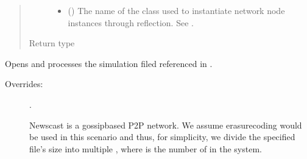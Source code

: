 \documentclass[letterpaper,10pt,english]{sphinxmanual}
\begin{document}
\begin{fulllineitems}
\begin{fulllineitems}
\begin{quote}
\begin{description}
\begin{itemize}
\item {} 
 () \textendash{} The name of the class used to instantiate network node
instances through reflection. See {\hyperref[\detokenize{app.domain:module-app.domain.network_nodes}]{}}.

\end{itemize}

\item[{Return type}] \leavevmode
{}

\end{description}\end{quote}

\end{fulllineitems}


\begin{fulllineitems}
\label{\detokenize{app.domain:app.domain.master_servers.NewscastMaster._process_simfile}}
Opens and processes the simulation filed referenced in .
\begin{description}
\item[{Overrides:}] \leavevmode
{\hyperref[\detokenize{app.domain:app.domain.master_servers.Master._process_simfile}]{}}.

Newscast is a gossip\sphinxhyphen{}based P2P network. We assume erasure\sphinxhyphen{}coding
would be used in this scenario and thus, for simplicity,
we divide the specified file’s size into multiple ,
where  is the number of {\hyperref[\detokenize{app.domain:app.domain.network_nodes.NewscastNode}]{}} in the system.

\end{description}


\end{fulllineitems}
\end{fulllineitems}
\end{document}

